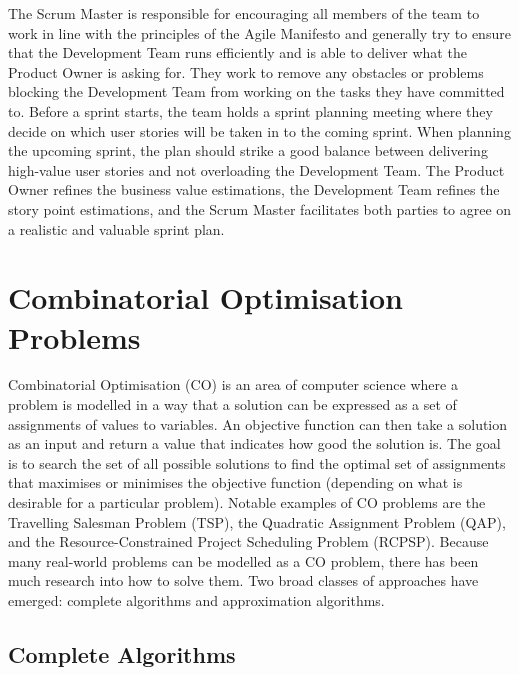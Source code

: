 The Scrum Master is responsible for encouraging all members of the team to work in line with the principles of the Agile Manifesto and generally try to ensure that the Development Team runs efficiently and is able to deliver what the Product Owner is asking for. They work to remove any obstacles or problems blocking the Development Team from working on the tasks they have committed to. Before a sprint starts, the team holds a sprint planning meeting where they decide on which user stories will be taken in to the coming sprint. When planning the upcoming sprint, the plan should strike a good balance between delivering high-value user stories and not overloading the Development Team. The Product Owner refines the business value estimations, the Development Team refines the story point estimations, and the Scrum Master facilitates both parties to agree on a realistic and valuable sprint plan.

\section{Combinatorial Optimisation Problems}

Combinatorial Optimisation (CO) is an area of computer science where a problem is modelled in a way that a solution can be expressed as a set of assignments of values to variables. An objective function can then take a solution as an input and return a value that indicates how good the solution is. The goal is to search the set of all possible solutions to find the optimal set of assignments that maximises or minimises the objective function (depending on what is desirable for a particular problem). Notable examples of CO problems are the Travelling Salesman Problem (TSP), the Quadratic Assignment Problem (QAP), and the Resource-Constrained Project Scheduling Problem (RCPSP). Because many real-world problems can be modelled as a CO problem, there has been much research into how to solve them. Two broad classes of approaches have emerged: complete algorithms and approximation algorithms.

\subsection{Complete Algorithms}
\label{subsec:complete_algorithms}

